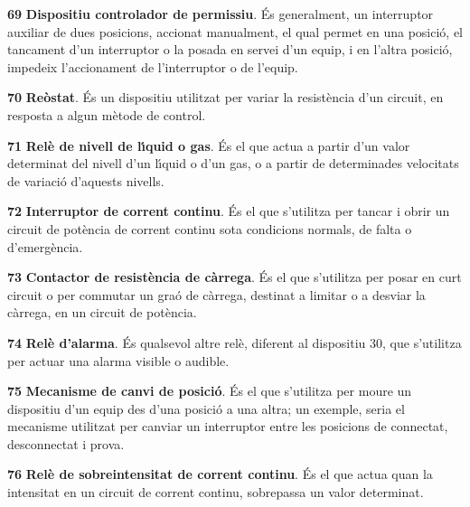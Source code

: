 \begin{multicols}{2}
\begin{list}{}
\item[\textbf{69}]  \textbf{Dispositiu controlador de permissiu}. \'{E}s
generalment, un interruptor auxiliar de dues posicions, accionat
manualment, el qual permet en una posici\'{o}, el tancament d'un
interruptor o la posada en servei d'un equip, i en l'altra posici\'{o},
impedeix l'accionament de l'interruptor o de l'equip.

\item[\textbf{70}]  \textbf{Re\`{o}stat}. \'{E}s un dispositiu utilitzat per
variar la resist\`{e}ncia d'un circuit, en resposta a algun m\`{e}tode de control.

\item[\textbf{71}]  \textbf{Rel\`{e} de nivell de l\'{\i}quid
o gas}. \'{E}s el que actua a partir d'un valor determinat del nivell
d'un l\'{\i}quid o d'un gas, o a partir de determinades velocitats de
variaci\'{o} d'aquests nivells.

\item[\textbf{72}]  \textbf{Interruptor de corrent
continu}. \'{E}s el que s'utilitza per tancar i obrir un circuit de pot\`{e}ncia de corrent continu
 sota condicions normals, de falta o d'emerg\`{e}ncia.

\item[\textbf{73}]  \textbf{Contactor de resist\`{e}ncia
 de c\`{a}rrega}. \'{E}s el que s'utilitza per posar en curt circuit o per commutar un gra\'{o} de c\`{a}rrega,
 destinat a limitar o a desviar la c\`{a}rrega, en un circuit de pot\`{e}ncia.

\item[\textbf{74}]  \textbf{Rel\`{e} d'alarma}. \'{E}s qualsevol altre rel\`{e},
diferent al dispositiu 30, que s'utilitza per actuar una alarma
visible o audible.

\item[\textbf{75}]  \textbf{Mecanisme de canvi
de posici\'{o}}. \'{E}s el que s'utilitza per moure un dispositiu d'un equip
des d'una posici\'{o} a una altra; un  exemple, seria el mecanisme
utilitzat per canviar un interruptor entre les posicions de
connectat, desconnectat i prova.

\item[\textbf{76}]  \textbf{Rel\`{e} de
sobreintensitat de corrent continu}. \'{E}s el que actua quan la intensitat en un circuit de
corrent continu, sobrepassa un valor determinat.


\end{list}
\end{multicols}
